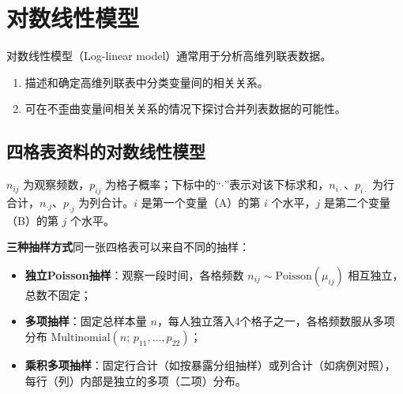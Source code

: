 \section{对数线性模型}
对数线性模型（Log-linear model）通常用于分析高维列联表数据。
\begin{enumerate}
\item 描述和确定高维列联表中分类变量间的相关关系。
\item 可在不歪曲变量间相关关系的情况下探讨合并列表数据的可能性。
\end{enumerate}
\subsection{四格表资料的对数线性模型}
\begin{annotation}$n_{ij}$ 为观察频数，$p_{ij}$ 为格子概率；下标中的“$\cdot$”表示对该下标求和，$n_{i\cdot}$、$p_{i\cdot}$ 为行合计，$n_{\cdot j}$、$p_{\cdot j}$ 为列合计。$i$ 是第一个变量（A）的第 $i$ 个水平，$j$ 是第二个变量（B）的第 $j$ 个水平。\end{annotation}
\textbf{三种抽样方式}\quad 同一张四格表可以来自不同的抽样：
\begin{itemize}
\item \textbf{独立Poisson抽样}：观察一段时间，各格频数 $n_{ij}\sim\text{Poisson}(\mu_{ij})$ 相互独立，总数不固定；
\item \textbf{多项抽样}：固定总样本量 $n$，每人独立落入4个格子之一，各格频数服从多项分布 $\text{Multinomial}(n;\,p_{11},\ldots,p_{22})$；
\item \textbf{乘积多项抽样}：固定行合计（如按暴露分组抽样）或列合计（如病例对照），每行（列）内部是独立的多项（二项）分布。
\end{itemize}

